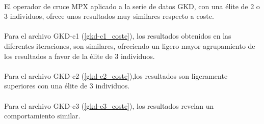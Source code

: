 	
	\paragraph{} El operador de cruce MPX aplicado a la serie de datos GKD, con una élite de 2 o 3 individuos, ofrece unos resultados muy similares respecto a coste.
	
	\paragraph{} Para el archivo GKD-c1  (\ref{gkd-c1_coste}), los resultados obtenidos en las diferentes iteraciones, son similares, ofreciendo un ligero mayor agrupamiento de los resultados a favor de la élite de 3 individuos.
	
	\paragraph{} Para el archivo GKD-c2  (\ref{gkd-c2_coste}),los resultados son ligeramente superiores con una élite de 3 individuos.
	
	\paragraph{} Para el archivo GKD-c3  (\ref{gkd-c3_coste}), los resultados revelan un comportamiento similar.
	
